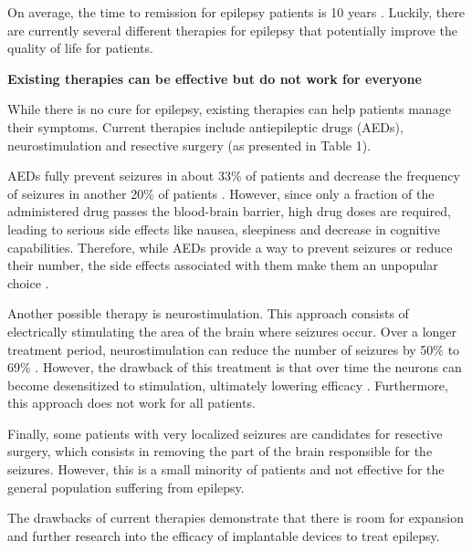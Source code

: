 \documentclass[usletter, 11pt]{extarticle}
\begin{document}
On average, the time to remission for epilepsy patients is 10 years \cite{shorvon1996}. Luckily, there are currently several different therapies for epilepsy that potentially improve the quality of life for patients.

\vspace{11pt}
\textbf{Existing therapies can be effective but do not work for everyone}

While there is no cure for epilepsy, existing therapies can help patients manage their symptoms. Current therapies include antiepileptic drugs (AEDs), neurostimulation and resective surgery (as presented in Table 1).

AEDs fully prevent seizures in about 33\% of patients and decrease the frequency of seizures in another 20\% of patients \cite{shorvon1996}. However, since only a fraction of the administered drug passes the blood-brain barrier, high drug doses are required, leading to serious side effects like nausea, sleepiness and decrease in cognitive capabilities. Therefore, while AEDs provide a way to prevent seizures or reduce their number, the side effects associated with them make them an unpopular choice \cite{kerr2012}.

Another possible therapy is neurostimulation. This approach consists of electrically stimulating the area of the brain where seizures occur. Over a longer treatment period, neurostimulation can reduce the number of seizures by 50\% to 69\% \cite{muller2016}. However, the drawback of this treatment is that over time the neurons can become desensitized to stimulation, ultimately lowering efficacy \cite{logesparan2012}. Furthermore, this approach does not work for all patients.

Finally, some patients with very localized seizures are candidates for resective surgery, which consists in removing the part of the brain responsible for the seizures. However, this is a small minority of patients and not effective for the general population suffering from epilepsy.

The drawbacks of current therapies demonstrate that there is room for expansion and further research into the efficacy of implantable devices to treat epilepsy.
\end{document}
